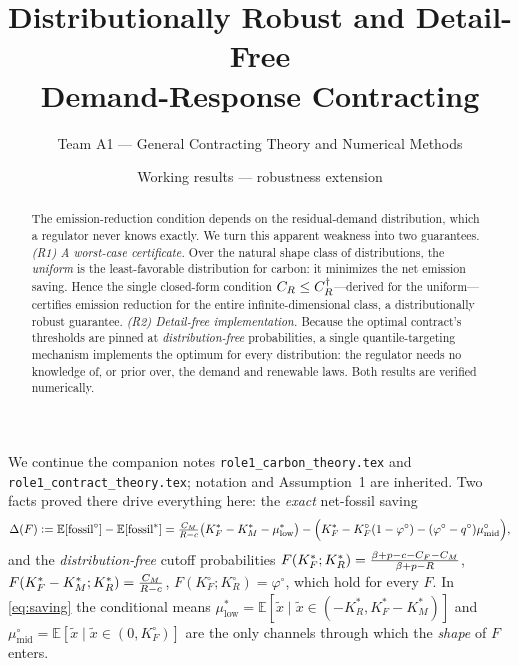 \documentclass[11pt,reqno]{amsart}
\theoremstyle{plain}
\theoremstyle{definition}\newtheorem{definition}{Definition}\newtheorem{assumption}{Assumption}
\theoremstyle{remark}\newtheorem{remark}{Remark}
\newcommand{\KRs}{K_R^{*}}\newcommand{\KFs}{K_F^{*}}\newcommand{\KMs}{K_M^{*}}
\newcommand{\KRo}{K_R^{\circ}}\newcommand{\KFo}{K_F^{\circ}}
\newcommand{\E}{\mathbb{E}}\newcommand{\eqdef}{\vcentcolon=}\newcommand{\Ucal}{\mathcal U}
\begin{document}
\title[Robust and Detail-Free Demand-Response Contracting]
{Distributionally Robust and Detail-Free\\ Demand-Response Contracting}
\author{Team A1 --- General Contracting Theory and Numerical Methods}
\date{Working results --- robustness extension}

\begin{abstract}
The emission-reduction condition depends on the residual-demand distribution,
which a regulator never knows exactly. We turn this apparent weakness into two
guarantees. \emph{(R1) A worst-case certificate.} Over the natural shape class of
distributions, the \emph{uniform} is the least-favorable distribution for carbon:
it minimizes the net emission saving. Hence the single closed-form condition
$C_R\le C_R^{\dagger}$---derived for the uniform---certifies emission reduction for
the entire infinite-dimensional class, a distributionally robust guarantee.
\emph{(R2) Detail-free implementation.} Because the optimal contract's thresholds
are pinned at \emph{distribution-free} probabilities, a single quantile-targeting
mechanism implements the optimum for every distribution: the regulator needs no
knowledge of, or prior over, the demand and renewable laws. Both results are
verified numerically.
\end{abstract}

\maketitle

We continue the companion notes \texttt{role1\_carbon\_theory.tex} and
\texttt{role1\_contract\_theory.tex}; notation and Assumption~1 are inherited.
Two facts proved there drive everything here:
the \emph{exact} net-fossil saving
\begin{equation}\label{eq:saving}
  \Delta(F)\eqdef\E[\text{fossil}^{\circ}]-\E[\text{fossil}^{*}]
  =\tfrac{\CM}{R-c}\big(\KFs-\KMs-\mu^{*}_{\mathrm{low}}\big)
   -\Big(\KFs-\KFo(1-\varphi^{\circ})-(\varphi^{\circ}-q^{\circ})\mu^{\circ}_{\mathrm{mid}}\Big),
\end{equation}
and the \emph{distribution-free} cutoff probabilities
$F(\KFs;\KRs)=\frac{\bp-c-\CF-\CM}{\bp-R}$,
$F(\KFs-\KMs;\KRs)=\frac{\CM}{R-c}$, $F(\KFo;\KRo)=\varphi^{\circ}$,
which hold for every $F$. In \eqref{eq:saving} the conditional means
$\mu^{*}_{\mathrm{low}}=\E[\tilde x\mid \tilde x\in(-\KRs,\KFs-\KMs)]$ and
$\mu^{\circ}_{\mathrm{mid}}=\E[\tilde x\mid \tilde x\in(0,\KFo)]$ are the only
channels through which the \emph{shape} of $F$ enters.
\end{document}
